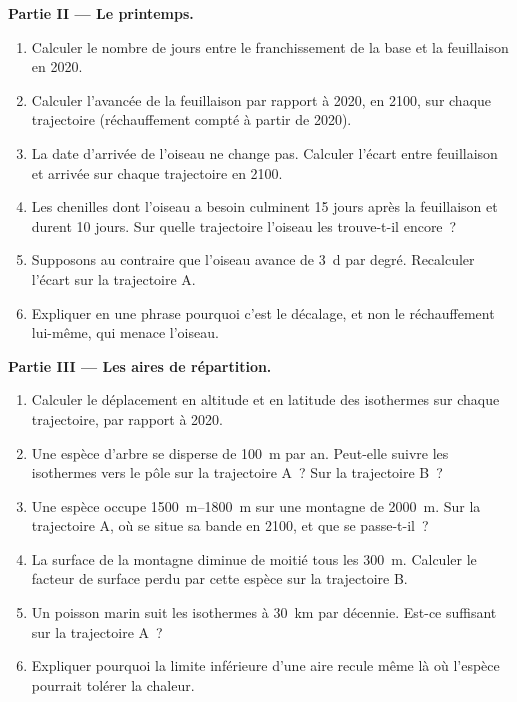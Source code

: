 \begin{problem}
\medskip
\noindent\textbf{Partie II --- Le printemps.}
\begin{enumerate}[resume]
  \item Calculer le nombre de jours entre le franchissement de la base et
        la feuillaison en 2020.
  \item Calculer l'avancée de la feuillaison par rapport à 2020, en 2100,
        sur chaque trajectoire (réchauffement compté à partir de 2020).
  \item La date d'arrivée de l'oiseau ne change pas. Calculer l'écart
        entre feuillaison et arrivée sur chaque trajectoire en 2100.
  \item Les chenilles dont l'oiseau a besoin culminent 15 jours après la
        feuillaison et durent 10 jours. Sur quelle trajectoire l'oiseau
        les trouve-t-il encore~?
  \item Supposons au contraire que l'oiseau avance de \qty{3}{d} par
        degré. Recalculer l'écart sur la trajectoire A.
  \item Expliquer en une phrase pourquoi c'est le décalage, et non le
        réchauffement lui-même, qui menace l'oiseau.
\end{enumerate}

\medskip
\noindent\textbf{Partie III --- Les aires de répartition.}
\begin{enumerate}[resume]
  \item Calculer le déplacement en altitude et en latitude des isothermes
        sur chaque trajectoire, par rapport à 2020.
  \item Une espèce d'arbre se disperse de \qty{100}{m} par an. Peut-elle
        suivre les isothermes vers le pôle sur la trajectoire A~? Sur la
        trajectoire B~?
  \item Une espèce occupe \qtyrange{1500}{1800}{m} sur une montagne de
        \qty{2000}{m}. Sur la trajectoire A, où se situe sa bande en 2100,
        et que se passe-t-il~?
  \item La surface de la montagne diminue de moitié tous les \qty{300}{m}.
        Calculer le facteur de surface perdu par cette espèce sur la
        trajectoire B.
  \item Un poisson marin suit les isothermes à \qty{30}{km} par décennie.
        Est-ce suffisant sur la trajectoire A~?
  \item Expliquer pourquoi la limite inférieure d'une aire recule même là
        où l'espèce pourrait tolérer la chaleur.
\end{enumerate}


\end{problem}
